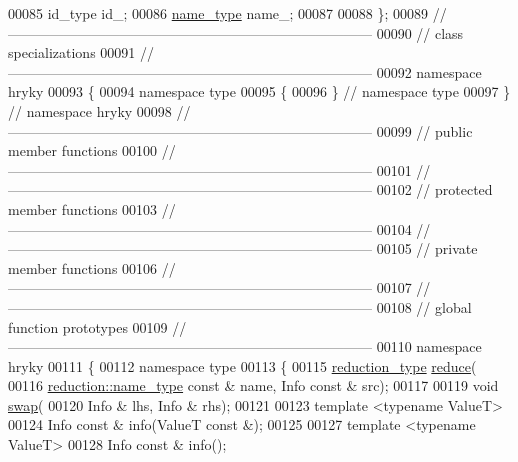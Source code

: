 \begin{DoxyCode}
00085     id\_type id\_;
00086     \hyperlink{classhryky_1_1_literal_string}{name_type} name\_;
00087 
00088 \};
00089 \textcolor{comment}{//
      ------------------------------------------------------------------------------}
00090 \textcolor{comment}{// class specializations}
00091 \textcolor{comment}{//
      ------------------------------------------------------------------------------}
00092 \textcolor{keyword}{namespace }hryky
00093 \{
00094 \textcolor{keyword}{namespace }type
00095 \{
00096 \} \textcolor{comment}{// namespace type}
00097 \} \textcolor{comment}{// namespace hryky}
00098 \textcolor{comment}{//
      ------------------------------------------------------------------------------}
00099 \textcolor{comment}{// public member functions}
00100 \textcolor{comment}{//
      ------------------------------------------------------------------------------}
00101 \textcolor{comment}{//
      ------------------------------------------------------------------------------}
00102 \textcolor{comment}{// protected member functions}
00103 \textcolor{comment}{//
      ------------------------------------------------------------------------------}
00104 \textcolor{comment}{//
      ------------------------------------------------------------------------------}
00105 \textcolor{comment}{// private member functions}
00106 \textcolor{comment}{//
      ------------------------------------------------------------------------------}
00107 \textcolor{comment}{//
      ------------------------------------------------------------------------------}
00108 \textcolor{comment}{// global function prototypes}
00109 \textcolor{comment}{//
      ------------------------------------------------------------------------------}
00110 \textcolor{keyword}{namespace }hryky
00111 \{
00112 \textcolor{keyword}{namespace }type
00113 \{
00115     \hyperlink{namespacehryky_a343a9a4c36a586be5c2693156200eadc}{reduction_type} \hyperlink{namespacehryky_af41cb3af6766761da0ff21b84527a52c}{reduce}(
00116         \hyperlink{namespacehryky_1_1reduction_ac686c30a4c8d196bbd0f05629a6b921f}{reduction::name_type} \textcolor{keyword}{const} & name, Info \textcolor{keyword}{const} & src);
00117 
00119     \textcolor{keywordtype}{void} \hyperlink{namespacehryky_a4282146df5ea2b68cb667896a2205909}{swap}(
00120         Info & lhs, Info & rhs);
00121 
00123     \textcolor{keyword}{template} <\textcolor{keyword}{typename} ValueT>
00124     Info \textcolor{keyword}{const} & info(ValueT \textcolor{keyword}{const} &);
00125 
00127     \textcolor{keyword}{template} <\textcolor{keyword}{typename} ValueT>
00128     Info \textcolor{keyword}{const} & info();

\end{DoxyCode}

